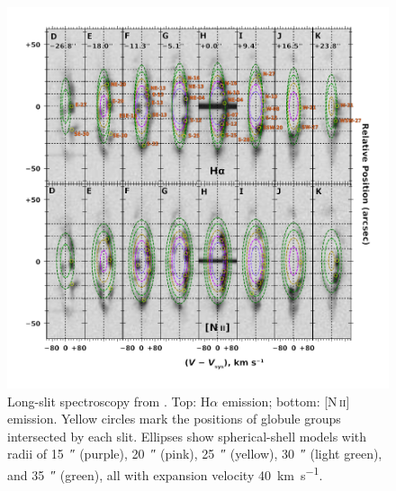 \documentclass{book}
\begin{document}
\begin{figure}[htb]
    \centering
    \includegraphics[width=\textwidth]{Nuevas imagenes finales/zavala-slit-spectra-select-annotated.pdf}
    \caption{Long-slit spectroscopy from \cite{Zavala:2022}. Top:
      H$\alpha$ emission; bottom: [N\,\textsc{ii}] emission. Yellow
      circles mark the positions of globule groups intersected by each
      slit. Ellipses show spherical-shell models with radii of
      \SI{15}{\arcsecond} (purple), \SI{20}{\arcsecond} (pink),
      \SI{25}{\arcsecond} (yellow), \SI{30}{\arcsecond} (light green),
      and \SI{35}{\arcsecond} (green), all with expansion velocity
      \SI{40}{km.s^{-1}}.}
    \label{fig:zavala_nudos}
\end{figure}
\end{document}
